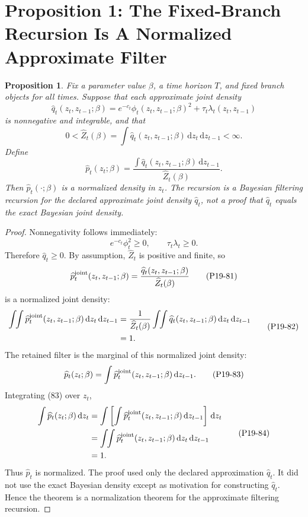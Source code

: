\documentclass[11pt]{article}
\newtheorem{proposition}{Proposition}
\newcommand{\dd}{\,\mathrm d}
\begin{document}
\section{Proposition 1: The Fixed-Branch Recursion Is A Normalized Approximate Filter}

\begin{proposition}
Fix a parameter value \(\beta\), a time horizon \(T\), and fixed branch objects
for all times.  Suppose that each approximate joint density
\[
    \widehat q_t(z_t,z_{t-1};\beta)
    =
    e^{-c_t}\phi_t(z_t,z_{t-1};\beta)^2
    +
    \tau_t\lambda_t(z_t,z_{t-1})
    \tag{P19-77}
\]
is nonnegative and integrable, and that
\[
    0<\widehat Z_t(\beta)
    =
    \int \widehat q_t(z_t,z_{t-1};\beta)\dd z_t\dd z_{t-1}
    <\infty.
    \tag{P19-78}
\]
Define
\[
    \widehat p_t(z_t;\beta)
    =
    \frac{\int \widehat q_t(z_t,z_{t-1};\beta)\dd z_{t-1}}
    {\widehat Z_t(\beta)}.
    \tag{P19-79}
\]
Then \(\widehat p_t(\cdot;\beta)\) is a normalized density in \(z_t\).  The
recursion is a Bayesian filtering recursion for the declared approximate joint
density \(\widehat q_t\), not a proof that \(\widehat q_t\) equals the exact
Bayesian joint density.
\end{proposition}

\begin{proof}
Nonnegativity follows immediately:
\[
    e^{-c_t}\phi_t^2\ge0,
    \qquad
    \tau_t\lambda_t\ge0.
    \tag{P19-80}
\]
Therefore \(\widehat q_t\ge0\).  By assumption,
\(\widehat Z_t\) is positive and finite, so
\[
    \widehat p_t^{\rm joint}(z_t,z_{t-1};\beta)
    =
    \frac{\widehat q_t(z_t,z_{t-1};\beta)}
    {\widehat Z_t(\beta)}
    \tag{P19-81}
\]
is a normalized joint density:
\[
\begin{aligned}
    \int\!\!\int
    \widehat p_t^{\rm joint}(z_t,z_{t-1};\beta)
    \dd z_t\dd z_{t-1}
    &=
    \frac{1}{\widehat Z_t(\beta)}
    \int\!\!\int
    \widehat q_t(z_t,z_{t-1};\beta)
    \dd z_t\dd z_{t-1}\\
    &=
    1.
\end{aligned}
\tag{P19-82}
\]
The retained filter is the marginal of this normalized joint density:
\[
    \widehat p_t(z_t;\beta)
    =
    \int
    \widehat p_t^{\rm joint}(z_t,z_{t-1};\beta)
    \dd z_{t-1}.
    \tag{P19-83}
\]
Integrating (83) over \(z_t\),
\[
\begin{aligned}
    \int \widehat p_t(z_t;\beta)\dd z_t
    &=
    \int
    \left[
    \int \widehat p_t^{\rm joint}(z_t,z_{t-1};\beta)
    \dd z_{t-1}
    \right]\dd z_t\\
    &=
    \int\!\!\int
    \widehat p_t^{\rm joint}(z_t,z_{t-1};\beta)
    \dd z_t\dd z_{t-1}\\
    &=
    1.
\end{aligned}
\tag{P19-84}
\]
Thus \(\widehat p_t\) is normalized.  The proof used only the declared
approximation \(\widehat q_t\).  It did not use the exact Bayesian density
except as motivation for constructing \(\widehat q_t\).  Hence the theorem is a
normalization theorem for the approximate filtering recursion.
\end{proof}
\end{document}
